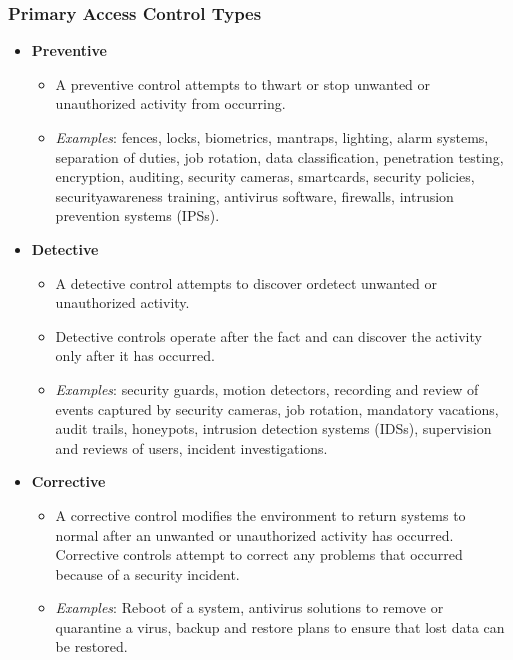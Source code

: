 \subsubsection{Primary Access Control Types}
\begin{itemize}
    \item \textbf{Preventive}
    \begin{itemize}
        \item A preventive control attempts to thwart or stop unwanted or unauthorized activity from occurring.
        \item \textit{Examples}: fences, locks, biometrics, mantraps, lighting, alarm systems, separation of duties, job rotation, data classification, penetration testing, encryption, auditing, security cameras, smartcards, security policies, securityawareness training, antivirus software, firewalls, intrusion prevention systems (IPSs).
    \end{itemize}
    \item \textbf{Detective}
    \begin{itemize}
        \item  A detective control attempts to discover ordetect unwanted or unauthorized activity.
        \item Detective controls operate after the fact and can discover the activity only after it has occurred.
        \item \textit{Examples}: security guards, motion detectors, recording and review of events captured by security cameras, job rotation, mandatory vacations, audit trails, honeypots, intrusion detection systems (IDSs), supervision and reviews of users, incident investigations.
    \end{itemize}
    \item \textbf{Corrective}
    \begin{itemize}
        \item A corrective control modifies the environment to return systems to normal after an unwanted or unauthorized activity has occurred. Corrective controls attempt to correct any problems that occurred because of a security incident.
        \item \textit{Examples}: Reboot of a system, antivirus solutions to remove or quarantine a virus, backup and restore plans to ensure that lost data can be restored.
    \end{itemize}
\end{itemize}


